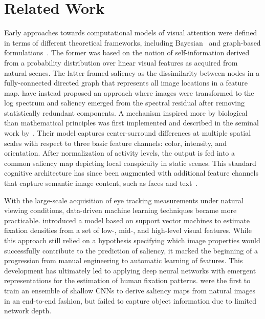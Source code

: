 \documentclass[final,1p,times,number]{elsarticle}
\begin{document}
\section{Related Work}

Early approaches towards computational models of visual attention were defined in terms of different theoretical frameworks, including Bayesian~\cite{zhang2008sun} and graph-based formulations~\cite{harel2007graph}. The former was based on the notion of self-information derived from a probability distribution over linear visual features as acquired from natural scenes. The latter framed saliency as the dissimilarity between nodes in a fully-connected directed graph that represents all image locations in a feature map. \citet{hou2007saliency} have instead proposed an approach where images were transformed to the log spectrum and saliency emerged from the spectral residual after removing statistically redundant components. A mechanism inspired more by biological than mathematical principles was first implemented and described in the seminal work by~\citet{itti1998model}. Their model captures center-surround differences at multiple spatial scales with respect to three basic feature channels: color, intensity, and orientation. After normalization of activity levels, the output is fed into a common saliency map depicting local conspicuity in static scenes. This standard cognitive architecture has since been augmented with additional feature channels that capture semantic image content, such as faces and text~\cite{cerf2009faces}.

With the large-scale acquisition of eye tracking measurements under natural viewing conditions, data-driven machine learning techniques became more practicable. \citet{judd2009learning} introduced a model based on support vector machines to estimate fixation densities from a set of low-, mid-, and high-level visual features. While this approach still relied on a hypothesis specifying which image properties would successfully contribute to the prediction of saliency, it marked the beginning of a progression from manual engineering to automatic learning of features. This development has ultimately led to applying deep neural networks with emergent representations for the estimation of human fixation patterns. \citet{vig2014large} were the first to train an ensemble of shallow CNNs to derive saliency maps from natural images in an end-to-end fashion, but failed to capture object information due to limited network depth.
\end{document}

